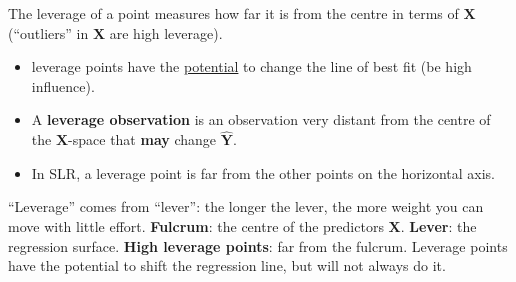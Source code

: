 \begin{center}
\end{center}

\begin{definition}[Leverage]
    The leverage of a point measures how far it is from the centre in terms of
    $\mathbf{X}$ (``outliers'' in $\mathbf{X}$ are high leverage).
    \begin{itemize}
        \item [High] leverage points have the \underline{potential} to change the line of best
        fit (be high influence).
        \item A \textbf{leverage observation} is an observation very distant from the centre of
        the $\mathbf{X}$-space that \textbf{may} change $\hat{\mathbf{Y}}$.
        \item In SLR, a leverage point is far from the other points on the horizontal axis.
    \end{itemize}
\end{definition}

\begin{remark}
    ``Leverage'' comes from ``lever'': the longer the lever, the more weight you can move with
    little effort. \textbf{Fulcrum}: the centre of the predictors $\mathbf{X}$.
    \textbf{Lever}: the regression surface. \textbf{High leverage points}: far from the
    fulcrum. Leverage points have the potential to shift the regression line, but will not
    always do it.
\end{remark}

